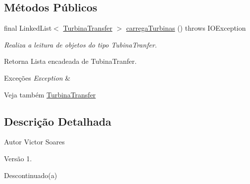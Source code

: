 \subsection*{Métodos Públicos}
\begin{DoxyCompactItemize}
\item 
final Linked\-List$<$ \hyperlink{classusina_1_1_d_a_o_1_1turbina_1_1_turbina_transfer}{Turbina\-Transfer} $>$ \hyperlink{classusina_1_1_d_a_o_1_1turbina_1_1_turbina_c_s_v_file_d_a_o_abf8ae21150d70fc4546232d3cefdbc2a}{carrega\-Turbinas} ()  throws I\-O\-Exception 
\begin{DoxyCompactList}\small\item\em Realiza a leitura de objetos do tipo Tubina\-Tranfer.

\begin{DoxyReturn}{Retorna}
Lista encadeada de Tubina\-Tranfer. 
\end{DoxyReturn}

\begin{DoxyExceptions}{Exceções}
{\em Exception} & \\
\hline
\end{DoxyExceptions}
\begin{DoxySeeAlso}{Veja também}
\hyperlink{classusina_1_1_d_a_o_1_1turbina_1_1_turbina_transfer}{Turbina\-Transfer}
\end{DoxySeeAlso}
 \end{DoxyCompactList}\end{DoxyCompactItemize}


\subsection{Descrição Detalhada}
\begin{DoxyAuthor}{Autor}
Victor Soares 
\end{DoxyAuthor}
\begin{DoxyVersion}{Versão}
1.
\end{DoxyVersion}
\begin{DoxyRefDesc}{Descontinuado(a)}
\item[\hyperlink{deprecated__deprecated000002}{Descontinuado(a)}]\end{DoxyRefDesc}


